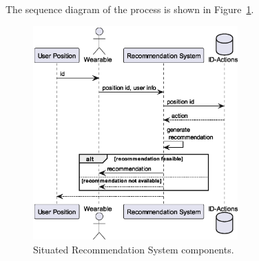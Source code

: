 The sequence diagram of the process is shown in Figure~\ref{fig:situated-recommendation}.

\begin{figure}[H]
	\centering
	\includegraphics[width=0.7\textwidth]{img/seq_diag_situated.eps}
	\caption{Situated Recommendation System components.}
	\label{fig:situated-recommendation}
\end{figure}
